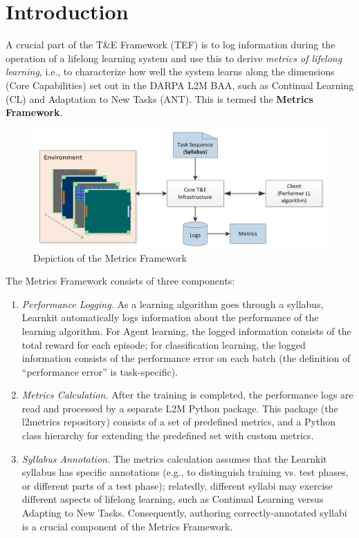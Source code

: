 \chapter{Introduction}\label{ch:overview}
A crucial part of the T\&E Framework (TEF) is to log information during the operation of a lifelong learning system and use this to derive \textit{metrics of lifelong learning}, i.e., to characterize how well the system learns along the dimensions (Core Capabilities) set out in the DARPA L2M BAA, such as Continual Learning (CL) and Adaptation to New Tasks (ANT). This is termed the \textbf{Metrics Framework}.\\[0.2in]

\begin{figure}[h]
	\centering
	\includegraphics[width=0.8\columnwidth]{sections/figs/metrics_diagram.png}
	\caption{Depiction of the Metrics Framework}
	\label{fig:framework}
\end{figure}

\flushleft The Metrics Framework consists of three components:\\[0.2in]
\begin{enumerate}
\item \textit{Performance Logging.} As a learning algorithm goes through a syllabus, Learnkit automatically logs information about the performance of the learning algorithm. For Agent learning, the logged information consists of the total reward for each episode; for classification learning, the logged information consists of the performance error on each batch (the definition of “performance error” is task-specific).\\[0.1in]
\item \textit{Metrics Calculation.} After the training is completed, the performance logs are read and processed by a separate L2M Python package. This package (the l2metrics repository) consists of a set of predefined metrics, and a Python class hierarchy for extending the predefined set with custom metrics.\\[0.1in]
\item \textit{Syllabus Annotation.} The metrics calculation assumes that the Learnkit syllabus has specific annotations (e.g., to distinguish training vs. test phases, or different parts of a test phase); relatedly, different syllabi may exercise different aspects of lifelong learning, such as Continual Learning versus Adapting to New Tasks. Consequently, authoring correctly-annotated syllabi is a crucial component of the Metrics Framework.\\[0.2in]
\end{enumerate}
    
